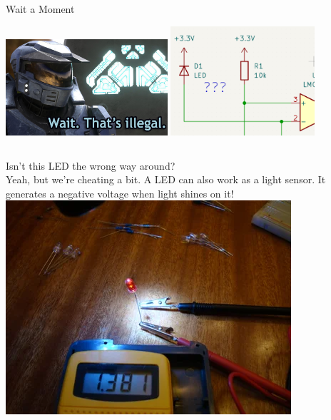 \documentclass{beamer}
\begin{document}
\begin{frame}{Wait a Moment}
  \begin{center}
  \includegraphics[width=0.45\textwidth]{images/thats-illegal.png}
  \includegraphics[width=0.4\textwidth]{images/diode-wrong-way.png}\\
  \end{center}
  \pause
  \begin{columns}
      Isn't this LED the wrong way around?\\
    \vspace{0.2cm}
      Yeah, but we're cheating a bit. A LED can also work as a light sensor.
      It generates a negative voltage when light shines on it!
    \includegraphics[width=\textwidth]{images/led-as-sensor.png}
  \end{columns}
\end{frame}
\end{document}
